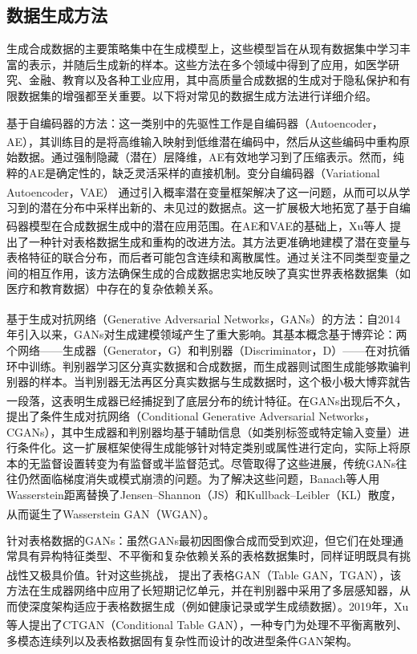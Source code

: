 \subsection{数据生成方法}
生成合成数据的主要策略集中在生成模型上，这些模型旨在从现有数据集中学习丰富的表示，并随后生成新的样本。这些方法在多个领域中得到了应用，如医学研究、金融、教育以及各种工业应用，其中高质量合成数据的生成对于隐私保护和有限数据集的增强都至关重要。以下将对常见的数据生成方法进行详细介绍。

基于自编码器的方法：这一类别中的先驱性工作是自编码器（Autoencoder，AE）\textsuperscript{\cite{hinton2006reducing}}，其训练目的是将高维输入映射到低维潜在编码中，然后从这些编码中重构原始数据。通过强制隐藏（潜在）层降维，AE有效地学习到了压缩表示。然而，纯粹的AE是确定性的，缺乏灵活采样的直接机制。变分自编码器（Variational Autoencoder，VAE）\textsuperscript{\cite{kingma2013auto}} 通过引入概率潜在变量框架解决了这一问题，从而可以从学习到的潜在分布中采样出新的、未见过的数据点。这一扩展极大地拓宽了基于自编码器模型在合成数据生成中的潜在应用范围。在AE和VAE的基础上，Xu等人\textsuperscript{\cite{xu2019modeling}} 提出了一种针对表格数据生成和重构的改进方法。其方法更准确地建模了潜在变量与表格特征的联合分布，而后者可能包含连续和离散属性。通过关注不同类型变量之间的相互作用，该方法确保生成的合成数据忠实地反映了真实世界表格数据集（如医疗和教育数据）中存在的复杂依赖关系。

基于生成对抗网络（Generative Adversarial Networks，GANs）\textsuperscript{\cite{goodfellow2014generative}}的方法：自2014年引入以来，GANs对生成建模领域产生了重大影响。其基本概念基于博弈论：两个网络——生成器（Generator，G）和判别器（Discriminator，D）——在对抗循环中训练。判别器学习区分真实数据和合成数据，而生成器则试图生成能够欺骗判别器的样本。当判别器无法再区分真实数据与生成数据时，这个极小极大博弈就告一段落，这表明生成器已经捕捉到了底层分布的统计特征。在GANs出现后不久，\textsuperscript{\cite{mirza2014conditional}} 提出了条件生成对抗网络（Conditional Generative Adversarial Networks，CGANs），其中生成器和判别器均基于辅助信息（如类别标签或特定输入变量）进行条件化。这一扩展框架使得生成能够针对特定类别或属性进行定向，实际上将原本的无监督设置转变为有监督或半监督范式。尽管取得了这些进展，传统GANs往往仍然面临梯度消失或模式崩溃的问题。为了解决这些问题，Banach等人用Wasserstein距离替换了Jensen–Shannon（JS）和Kullback–Leibler（KL）散度，从而诞生了Wasserstein GAN（WGAN）\textsuperscript{\cite{adler2018banach,arjovsky2017towards}}。

针对表格数据的GANs：虽然GANs最初因图像合成而受到欢迎，但它们在处理通常具有异构特征类型、不平衡和复杂依赖关系的表格数据集时，同样证明既具有挑战性又极具价值。针对这些挑战，\textsuperscript{\cite{xu2018synthesizing}} 提出了表格GAN（Table GAN，TGAN），该方法在生成器网络中应用了长短期记忆单元，并在判别器中采用了多层感知器，从而使深度架构适应于表格数据生成（例如健康记录或学生成绩数据）。2019年，Xu等人\textsuperscript{\cite{xu2019modeling}}提出了CTGAN（Conditional Table GAN），一种专门为处理不平衡离散列、多模态连续列以及表格数据固有复杂性而设计的改进型条件GAN架构。

